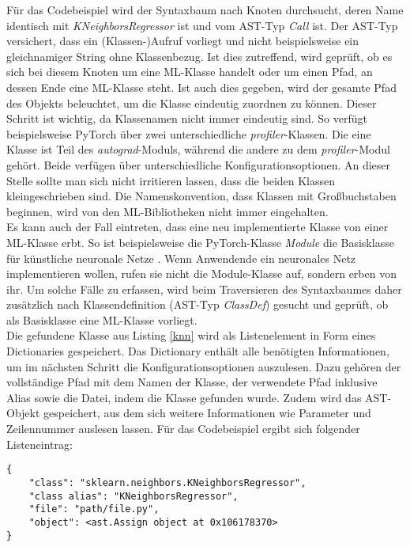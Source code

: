 \documentclass[german,bachelor]{swsLeipzig}
\begin{document}
\noindent Für das Codebeispiel wird der Syntaxbaum nach Knoten durchsucht, deren Name identisch mit \textit{KNeighborsRegressor} ist und
vom AST-Typ \textit{Call} ist.
Der AST-Typ versichert, dass ein (Klassen-)Aufruf vorliegt und nicht beispielsweise ein gleichnamiger String ohne Klassenbezug.
Ist dies zutreffend, wird geprüft, ob es sich bei diesem Knoten um eine ML-Klasse handelt oder um einen Pfad, an dessen Ende eine ML-Klasse steht.
Ist auch dies gegeben, wird der gesamte Pfad des Objekts beleuchtet, um die Klasse eindeutig zuordnen zu können.
Dieser Schritt ist wichtig, da Klassenamen nicht immer eindeutig sind.
So verfügt beispielsweise PyTorch über zwei unterschiedliche \textit{profiler}-Klassen.
Die eine Klasse ist Teil des \textit{autograd}-Moduls, während die andere zu dem \textit{profiler}-Modul gehört.
Beide verfügen über unterschiedliche Konfigurationsoptionen.
An dieser Stelle sollte man sich nicht irritieren lassen, dass die beiden Klassen kleingeschrieben sind.
Die Namenskonvention, dass Klassen mit Großbuchstaben beginnen, wird von den ML-Bibliotheken nicht immer eingehalten.\\
\indent Es kann auch der Fall eintreten, dass eine neu implementierte Klasse von einer ML-Klasse erbt.
So ist beispielsweise die PyTorch-Klasse \textit{Module} die Basisklasse für künstliche neuronale Netze \cite[]{NEURIPS2019_9015}.
Wenn Anwendende ein neuronales Netz implementieren wollen, rufen sie nicht die Module-Klasse auf, sondern erben von ihr.
Um solche Fälle zu erfassen, wird beim Traversieren des Syntaxbaumes daher zusätzlich nach Klassendefinition (AST-Typ \textit{ClassDef}) gesucht und geprüft,
ob als Basisklasse eine ML-Klasse vorliegt. \\
\indent Die gefundene Klasse aus Listing \ref{knn} wird als Listenelement in Form eines Dictionaries gespeichert.
Das Dictionary enthält alle benötigten Informationen, um im nächsten Schritt
die Konfigurationsoptionen auszulesen.
Dazu gehören der vollständige Pfad mit dem Namen der Klasse, der verwendete Pfad inklusive Alias sowie die Datei, indem
die Klasse gefunden wurde.
Zudem wird das AST-Objekt gespeichert, aus dem sich weitere Informationen wie Parameter und Zeilennummer auslesen lassen.
Für das Codebeispiel ergibt sich folgender Listeneintrag:\\

\noindent\begin{minipage}{\linewidth}
\begin{lstlisting}[style=json, frame=single, label=class_dict, basicstyle=\small, caption={Dictionary-Eintrag der KNeighborsRegressor-Klasse},captionpos=b]
{
    "class": "sklearn.neighbors.KNeighborsRegressor",
    "class alias": "KNeighborsRegressor",
    "file": "path/file.py",
    "object": <ast.Assign object at 0x106178370>
}
\end{lstlisting}
\end{minipage}
\
\end{document}
